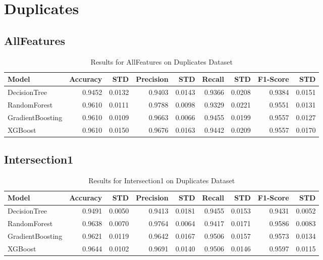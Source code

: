 \documentclass{article}
\begin{document}
\section{Duplicates}

\subsection{AllFeatures}
\begin{table}[h!]
\centering
\caption{Results for AllFeatures on Duplicates Dataset}
\begin{tabular}{l|rr|rr|rr|rr}
\hline
Model & Accuracy & STD & Precision & STD & Recall & STD & F1-Score & STD \\
\hline
DecisionTree & 0.9452 & 0.0132 & 0.9403 & 0.0143 & 0.9366 & 0.0208 & 0.9384 & 0.0151 \\
RandomForest & 0.9610 & 0.0111 & 0.9788 & 0.0098 & 0.9329 & 0.0221 & 0.9551 & 0.0131 \\
GradientBoosting & 0.9610 & 0.0109 & 0.9663 & 0.0066 & 0.9455 & 0.0199 & 0.9557 & 0.0127 \\
XGBoost & 0.9610 & 0.0150 & 0.9676 & 0.0163 & 0.9442 & 0.0209 & 0.9557 & 0.0170 \\
\hline
\end{tabular}
\end{table}

\subsection{Intersection1}
\begin{table}[h!]
\centering
\caption{Results for Intersection1 on Duplicates Dataset}
\begin{tabular}{l|rr|rr|rr|rr}
\hline
Model & Accuracy & STD & Precision & STD & Recall & STD & F1-Score & STD \\
\hline
DecisionTree & 0.9491 & 0.0050 & 0.9413 & 0.0181 & 0.9455 & 0.0153 & 0.9431 & 0.0052 \\
RandomForest & 0.9638 & 0.0070 & 0.9764 & 0.0064 & 0.9417 & 0.0171 & 0.9586 & 0.0083 \\
GradientBoosting & 0.9621 & 0.0119 & 0.9642 & 0.0167 & 0.9506 & 0.0157 & 0.9573 & 0.0134 \\
XGBoost & 0.9644 & 0.0102 & 0.9691 & 0.0140 & 0.9506 & 0.0146 & 0.9597 & 0.0115 \\
\hline
\end{tabular}
\end{table}
\end{document}
